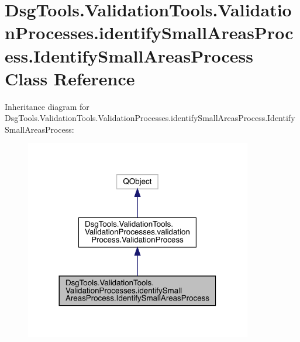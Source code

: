 \hypertarget{class_dsg_tools_1_1_validation_tools_1_1_validation_processes_1_1identify_small_areas_process_1_1_identify_small_areas_process}{}\section{Dsg\+Tools.\+Validation\+Tools.\+Validation\+Processes.\+identify\+Small\+Areas\+Process.\+Identify\+Small\+Areas\+Process Class Reference}
\label{class_dsg_tools_1_1_validation_tools_1_1_validation_processes_1_1identify_small_areas_process_1_1_identify_small_areas_process}


Inheritance diagram for Dsg\+Tools.\+Validation\+Tools.\+Validation\+Processes.\+identify\+Small\+Areas\+Process.\+Identify\+Small\+Areas\+Process\+:
\nopagebreak
\begin{figure}[H]
\begin{center}
\leavevmode
\includegraphics[width=281pt]{class_dsg_tools_1_1_validation_tools_1_1_validation_processes_1_1identify_small_areas_process_1_ccaba7dbe81fe0f8137d846d181b36bc}
\end{center}
\end{figure}


